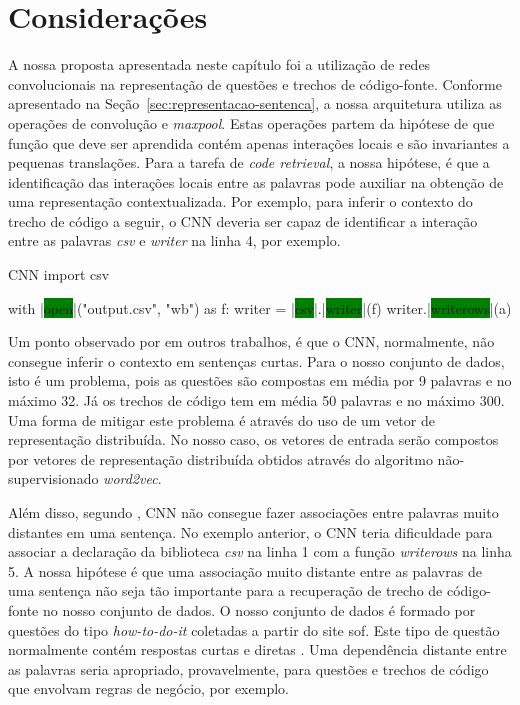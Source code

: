 \section{Considerações}

A nossa proposta apresentada neste capítulo foi a utilização de redes convolucionais na representação de questões e trechos de código-fonte. Conforme apresentado na Seção~\ref{sec:representacao-sentenca}, a nossa arquitetura utiliza as operações de convolução e \textit{maxpool}. Estas operações partem da hipótese de que função que deve ser aprendida contém apenas interações locais e são invariantes a pequenas translações. Para a tarefa de \textit{code retrieval}, a nossa hipótese, é que a identificação das interações locais entre as palavras pode auxiliar na obtenção de uma representação contextualizada. Por exemplo, para inferir o contexto do trecho de código a seguir, o CNN deveria ser capaz de identificar a interação entre as palavras \emph{csv} e \emph{writer} na linha 4, por exemplo. 

\begin{mypython-linenumber}{CNN}
import csv

with |\colorbox{green}{open}|("output.csv", "wb") as f:
    writer = |\colorbox{green}{csv}|.|\colorbox{green}{writer}|(f)
    writer.|\colorbox{green}{writerows}|(a)
\end{mypython-linenumber}

Um ponto observado por \cite{tom-young:trends-deep-learning-nlp} em outros trabalhos, é que o CNN, normalmente, não consegue inferir o contexto em sentenças curtas. Para o nosso conjunto de dados, isto é um problema, pois as questões são compostas em média por 9 palavras e no máximo 32. Já os trechos de código tem em média 50 palavras e no máximo 300. Uma forma de mitigar este problema é através do uso de um vetor de representação distribuída. No nosso caso, os vetores de entrada serão compostos por vetores de representação distribuída obtidos através do algoritmo não-supervisionado \textit{word2vec}.

Além disso, segundo \cite{Goodfellow-et-al-2016}, CNN não consegue fazer associações entre palavras muito distantes em uma sentença. No exemplo anterior, o CNN teria dificuldade para associar a declaração da biblioteca \emph{csv} na linha 1 com a função \emph{writerows} na linha 5. A nossa hipótese é que uma associação muito distante entre as palavras de uma sentença não seja tão importante para a recuperação de trecho de código-fonte no nosso conjunto de dados. O nosso conjunto de dados é formado por questões do tipo \textit{how-to-do-it} coletadas a partir do site \gls{sof}. Este tipo de questão normalmente contém respostas curtas e diretas  \citep{yao-2018}. Uma dependência distante entre as palavras seria apropriado, provavelmente, para questões e trechos de código que envolvam regras de negócio, por exemplo.


